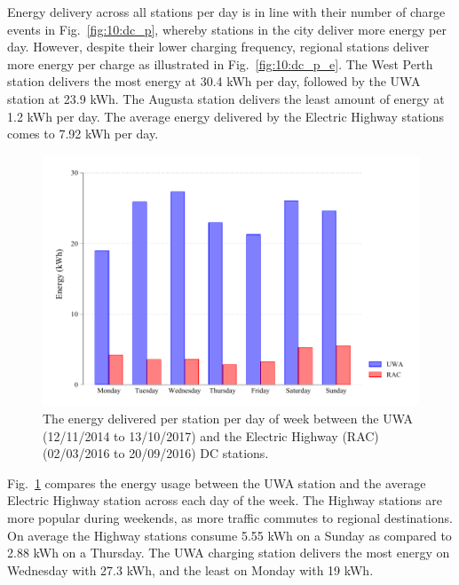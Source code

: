 Energy delivery across all stations per day is in line with their number of charge events in Fig.~\ref{fig:10:dc_p}, whereby stations in the city deliver more energy per day. However, despite their lower charging frequency, regional stations deliver more energy per charge as illustrated in Fig.~\ref{fig:10:dc_p_e}. The West Perth station delivers the most energy at 30.4 kWh per day, followed by the UWA station at 23.9 kWh. The Augusta station delivers the least amount of energy at 1.2 kWh per day. The average energy delivered by the Electric Highway stations comes to 7.92 kWh per day.

\begin{figure}[H]
	\centering
	\includegraphics[width=0.8\linewidth]{uwarac_e}
	\caption[Energy delivered per station per day of week]{The energy delivered per station per day of week between the UWA (12/11/2014 to 13/10/2017) and the Electric Highway (RAC) (02/03/2016 to 20/09/2016) DC stations.}
	\label{fig:10:uwarac_e}
\end{figure}

Fig.~\ref{fig:10:uwarac_e} compares the energy usage between the UWA station and the average Electric Highway station across each day of the week. The Highway stations are more popular during weekends, as more traffic commutes to regional destinations. On average the Highway stations consume 5.55 kWh on a Sunday as compared to 2.88 kWh on a Thursday. The UWA charging station delivers the most energy on Wednesday with 27.3 kWh, and the least on Monday with 19 kWh.

